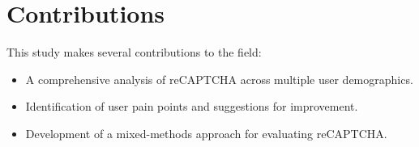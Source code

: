 \documentclass{article}
\begin{document}
\section{Contributions}
This study makes several contributions to the field:
\begin{itemize}
    \item A comprehensive analysis of reCAPTCHA across multiple user demographics.
    \item Identification of user pain points and suggestions for improvement.
    \item Development of a mixed-methods approach for evaluating reCAPTCHA.
\end{itemize}



\end{document}
